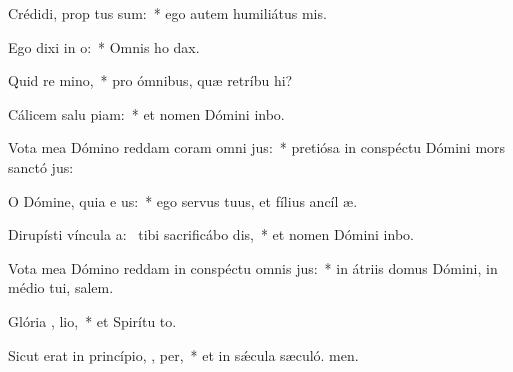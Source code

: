 \item Crédidi, prop  tus sum:~* ego autem humiliátus  mis.
\item Ego dixi in  o:~* Omnis ho dax.
\item Quid re mino,~* pro ómnibus, quæ retríbu hi?
\item Cálicem salu piam:~* et nomen Dómini inbo.
\item Vota mea Dómino reddam coram omni  jus:~* pretiósa in conspéctu Dómini mors sanctó jus:
\item O Dómine, quia e  us:~* ego servus tuus, et fílius ancíl æ.
\item Dirupísti víncula a:~\pscross{} tibi sacrificábo  dis,~* et nomen Dómini inbo.
\item Vota mea Dómino reddam in conspéctu omnis  jus:~* in átriis domus Dómini, in médio tui, salem.
\item Glória ,  lio,~* et Spirítu to.
\item Sicut erat in princípio,  ,  per,~* et in sǽcula sæculó. men.
